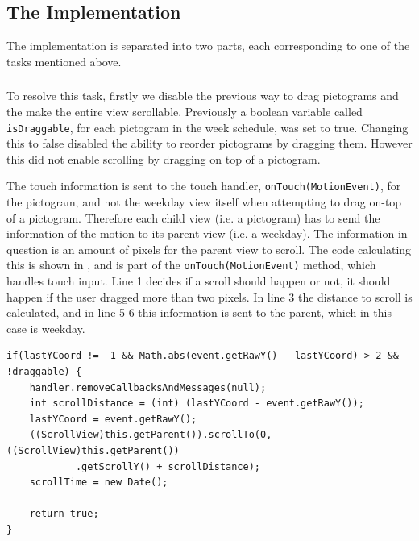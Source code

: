 \subsection*{The Implementation}
The implementation is separated into two parts, each corresponding to one of the tasks mentioned above. 
\subsubsection*{} 
To resolve this task, firstly we disable the previous way to drag pictograms and the make the entire view scrollable. 
Previously a boolean variable called \texttt{isDraggable}, for each pictogram in the week schedule, was set to true. 
Changing this to false disabled the ability to reorder pictograms by dragging them. 
However this did not enable scrolling by dragging on top of a pictogram. 

The touch information is sent to the touch handler, \texttt{onTouch(MotionEvent)}, for the pictogram, and not the weekday view itself when attempting to drag on-top of a pictogram. 
Therefore each child view (i.e. a pictogram) has to send the information of the motion to its parent view (i.e. a weekday). 
The information in question is an amount of pixels for the parent view to scroll. 
The code calculating this is shown in , and is part of the \texttt{onTouch(MotionEvent)} method, which handles touch input. 
Line 1 decides if a scroll should happen or not, it should happen if the user dragged more than two pixels. 
In line 3 the distance to scroll is calculated, and in line 5-6 this information is sent to the parent, which in this case is weekday.  

\begin{lstlisting}[floatplacement=h, caption={The code executed when someone performs a move action.}, label={lst:actionmove}] 
if(lastYCoord != -1 && Math.abs(event.getRawY() - lastYCoord) > 2 && !draggable) {
    handler.removeCallbacksAndMessages(null);
    int scrollDistance = (int) (lastYCoord - event.getRawY());
    lastYCoord = event.getRawY();
    ((ScrollView)this.getParent()).scrollTo(0,((ScrollView)this.getParent())
    		.getScrollY() + scrollDistance);
	scrollTime = new Date();

	return true;
}
\end{lstlisting}


